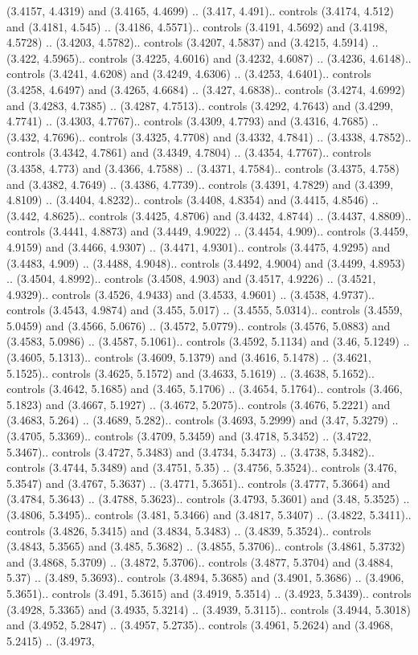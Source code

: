 (3.4157, 4.4319) and (3.4165, 4.4699) .. (3.417, 4.491).. controls (3.4174, 4.512) and (3.4181, 4.545) .. (3.4186, 4.5571).. controls (3.4191, 4.5692) and (3.4198, 4.5728) .. (3.4203, 4.5782).. controls (3.4207, 4.5837) and (3.4215, 4.5914) .. (3.422, 4.5965).. controls (3.4225, 4.6016) and (3.4232, 4.6087) .. (3.4236, 4.6148).. controls (3.4241, 4.6208) and (3.4249, 4.6306) .. (3.4253, 4.6401).. controls (3.4258, 4.6497) and (3.4265, 4.6684) .. (3.427, 4.6838).. controls (3.4274, 4.6992) and (3.4283, 4.7385) .. (3.4287, 4.7513).. controls (3.4292, 4.7643) and (3.4299, 4.7741) .. (3.4303, 4.7767).. controls (3.4309, 4.7793) and (3.4316, 4.7685) .. (3.432, 4.7696).. controls (3.4325, 4.7708) and (3.4332, 4.7841) .. (3.4338, 4.7852).. controls (3.4342, 4.7861) and (3.4349, 4.7804) .. (3.4354, 4.7767).. controls (3.4358, 4.773) and (3.4366, 4.7588) .. (3.4371, 4.7584).. controls (3.4375, 4.758) and (3.4382, 4.7649) .. (3.4386, 4.7739).. controls (3.4391, 4.7829) and (3.4399, 4.8109) .. (3.4404, 4.8232).. controls (3.4408, 4.8354) and (3.4415, 4.8546) .. (3.442, 4.8625).. controls (3.4425, 4.8706) and (3.4432, 4.8744) .. (3.4437, 4.8809).. controls (3.4441, 4.8873) and (3.4449, 4.9022) .. (3.4454, 4.909).. controls (3.4459, 4.9159) and (3.4466, 4.9307) .. (3.4471, 4.9301).. controls (3.4475, 4.9295) and (3.4483, 4.909) .. (3.4488, 4.9048).. controls (3.4492, 4.9004) and (3.4499, 4.8953) .. (3.4504, 4.8992).. controls (3.4508, 4.903) and (3.4517, 4.9226) .. (3.4521, 4.9329).. controls (3.4526, 4.9433) and (3.4533, 4.9601) .. (3.4538, 4.9737).. controls (3.4543, 4.9874) and (3.455, 5.017) .. (3.4555, 5.0314).. controls (3.4559, 5.0459) and (3.4566, 5.0676) .. (3.4572, 5.0779).. controls (3.4576, 5.0883) and (3.4583, 5.0986) .. (3.4587, 5.1061).. controls (3.4592, 5.1134) and (3.46, 5.1249) .. (3.4605, 5.1313).. controls (3.4609, 5.1379) and (3.4616, 5.1478) .. (3.4621, 5.1525).. controls (3.4625, 5.1572) and (3.4633, 5.1619) .. (3.4638, 5.1652).. controls (3.4642, 5.1685) and (3.465, 5.1706) .. (3.4654, 5.1764).. controls (3.466, 5.1823) and (3.4667, 5.1927) .. (3.4672, 5.2075).. controls (3.4676, 5.2221) and (3.4683, 5.264) .. (3.4689, 5.282).. controls (3.4693, 5.2999) and (3.47, 5.3279) .. (3.4705, 5.3369).. controls (3.4709, 5.3459) and (3.4718, 5.3452) .. (3.4722, 5.3467).. controls (3.4727, 5.3483) and (3.4734, 5.3473) .. (3.4738, 5.3482).. controls (3.4744, 5.3489) and (3.4751, 5.35) .. (3.4756, 5.3524).. controls (3.476, 5.3547) and (3.4767, 5.3637) .. (3.4771, 5.3651).. controls (3.4777, 5.3664) and (3.4784, 5.3643) .. (3.4788, 5.3623).. controls (3.4793, 5.3601) and (3.48, 5.3525) .. (3.4806, 5.3495).. controls (3.481, 5.3466) and (3.4817, 5.3407) .. (3.4822, 5.3411).. controls (3.4826, 5.3415) and (3.4834, 5.3483) .. (3.4839, 5.3524).. controls (3.4843, 5.3565) and (3.485, 5.3682) .. (3.4855, 5.3706).. controls (3.4861, 5.3732) and (3.4868, 5.3709) .. (3.4872, 5.3706).. controls (3.4877, 5.3704) and (3.4884, 5.37) .. (3.489, 5.3693).. controls (3.4894, 5.3685) and (3.4901, 5.3686) .. (3.4906, 5.3651).. controls (3.491, 5.3615) and (3.4919, 5.3514) .. (3.4923, 5.3439).. controls (3.4928, 5.3365) and (3.4935, 5.3214) .. (3.4939, 5.3115).. controls (3.4944, 5.3018) and (3.4952, 5.2847) .. (3.4957, 5.2735).. controls (3.4961, 5.2624) and (3.4968, 5.2415) .. (3.4973, 